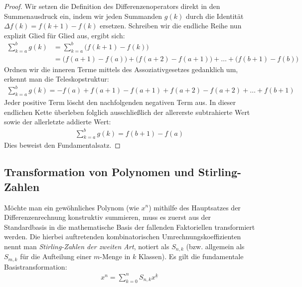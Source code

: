\documentclass{article}
\theoremstyle{definition}
\begin{document}
\begin{proof}
Wir setzen die Definition des Differenzenoperators direkt in den Summenausdruck ein, indem wir jeden Summanden $g(k)$ durch die Identität $\Delta f(k) = f(k+1) - f(k)$ ersetzen. Schreiben wir die endliche Reihe nun explizit Glied für Glied aus, ergibt sich:
\begin{align*}
    \sum_{k=a}^b g(k) &= \sum_{k=a}^b \big( f(k+1) - f(k) \big) \\
    &= \big(f(a+1) - f(a)\big) + \big(f(a+2) - f(a+1)\big) + \dots + \big(f(b+1) - f(b)\big)
\end{align*}
Ordnen wir die inneren Terme mittels des Assoziativgesetzes gedanklich um, erkennt man die Teleskopstruktur:
\begin{align*}
    \sum_{k=a}^b g(k) = -f(a) + f(a+1) - f(a+1) + f(a+2) - f(a+2) + \dots + f(b+1)
\end{align*}
Jeder positive Term löscht den nachfolgenden negativen Term aus. In dieser endlichen Kette überleben folglich ausschließlich der allererste subtrahierte Wert sowie der allerletzte addierte Wert:
\begin{align*}
    \sum_{k=a}^b g(k) = f(b+1) - f(a)
\end{align*}
Dies beweist den Fundamentalsatz.
\end{proof}

\subsection{Transformation von Polynomen und Stirling-Zahlen}
Möchte man ein gewöhnliches Polynom (wie $x^n$) mithilfe des Hauptsatzes der Differenzenrechnung konstruktiv summieren, muss es zuerst aus der Standardbasis in die mathematische Basis der fallenden Faktoriellen transformiert werden. Die hierbei auftretenden kombinatorischen Umrechnungskoeffizienten nennt man \textit{Stirling-Zahlen der zweiten Art}, notiert als $S_{n,k}$ (bzw. allgemein als $S_{m,k}$ für die Aufteilung einer $m$-Menge in $k$ Klassen). Es gilt die fundamentale Basistransformation:
\begin{align*}
    x^n = \sum_{k=0}^n S_{n,k} x^{\underline{k}}
\end{align*}
\end{document}
